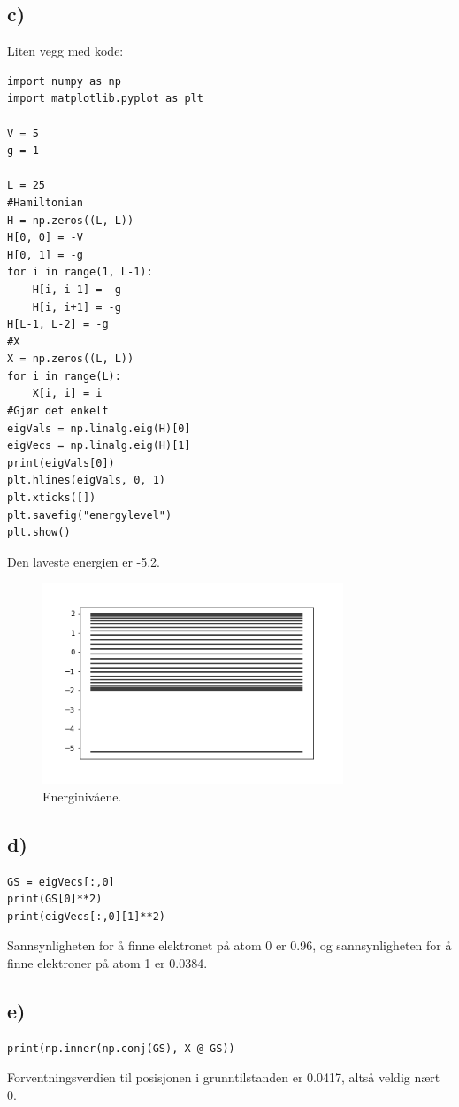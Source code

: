 \documentclass[norsk,a4paper,12pt]{article}
\begin{document}
	\subsection*{c)}
	Liten vegg med kode:
	\begin{verbatim}
import numpy as np
import matplotlib.pyplot as plt

V = 5
g = 1

L = 25
#Hamiltonian
H = np.zeros((L, L))
H[0, 0] = -V
H[0, 1] = -g
for i in range(1, L-1):
    H[i, i-1] = -g
    H[i, i+1] = -g
H[L-1, L-2] = -g
#X
X = np.zeros((L, L))
for i in range(L):
    X[i, i] = i
#Gjør det enkelt
eigVals = np.linalg.eig(H)[0]
eigVecs = np.linalg.eig(H)[1]
print(eigVals[0])
plt.hlines(eigVals, 0, 1)
plt.xticks([])
plt.savefig("energylevel")
plt.show()
	\end{verbatim}
	Den laveste energien er -5.2.
	\begin{figure}[H]
		\includegraphics[width=90mm]{../energylevel.png}
		\caption{Energinivåene.}
		\label{fig:energylevel}
	\end{figure}
	
	\subsection*{d)}
	\begin{verbatim}
GS = eigVecs[:,0]
print(GS[0]**2)
print(eigVecs[:,0][1]**2)
	\end{verbatim}
	Sannsynligheten for å finne elektronet på atom 0 er 0.96, og sannsynligheten for å finne elektroner på atom 1 er 0.0384.
	
	\subsection*{e)}
	\begin{verbatim}
print(np.inner(np.conj(GS), X @ GS))
	\end{verbatim}
	Forventningsverdien til posisjonen i grunntilstanden er 0.0417, altså veldig nært 0.
	
\end{document}

